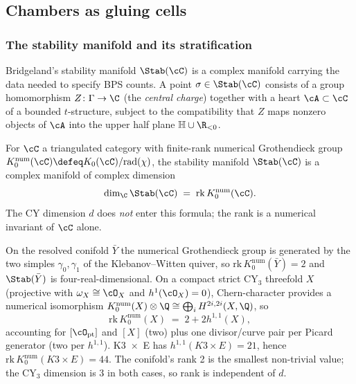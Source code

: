 \subsection{Chambers as gluing cells}
\label{sec:chambers-gluing-cells}

\subsubsection{The stability manifold and its stratification}

Bridgeland's stability manifold $\Stab(\cC)$ is a complex manifold carrying
the data needed to specify BPS counts. A point $\sigma \in \Stab(\cC)$
consists of a group homomorphism $Z \colon \Gamma \to \C$ (the
\emph{central charge}) together with a heart $\cA \subset \cC$ of a bounded
$t$-structure, subject to the compatibility that $Z$ maps nonzero objects of
$\cA$ into the upper half plane $\mathbb H \cup \R_{<0}$.

\begin{proposition}[Stab dimension = numerical Grothendieck rank, Bridgeland (2007, arXiv:math/0212237) Thm 7.1]
 \label{prop:stab-dim-equals-K0num-rank}
 For $\cC$ a triangulated category with finite-rank numerical Grothendieck
 group $K_0^{\mathrm{num}}(\cC) \defeq K_0(\cC) / \mathrm{rad}(\chi)$, the
 stability manifold $\Stab(\cC)$ is a complex manifold of complex dimension
 \[
 \dim_\C \Stab(\cC) \;=\; \mathrm{rk}\, K_0^{\mathrm{num}}(\cC).
 \]
 The CY dimension $d$ does \emph{not} enter this formula; the rank is a
 numerical invariant of $\cC$ alone.
\end{proposition}

\begin{example}
 \label{ex:conifold-strict-cy3-ranks}
 On the resolved conifold $\bar Y$ the numerical Grothendieck group is
 generated by the two simples $\gamma_0, \gamma_1$ of the Klebanov--Witten
 quiver, so $\mathrm{rk}\, K_0^{\mathrm{num}}(\bar Y) = 2$ and $\Stab(\bar
 Y)$ is four-real-dimensional. On a compact strict CY$_3$ threefold $X$
 (projective with $\omega_X \cong \cO_X$ and $h^1(\cO_X) = 0$),
 Chern-character provides a numerical isomorphism
 $K_0^{\mathrm{num}}(X) \otimes \Q \cong \bigoplus_i H^{2i, 2i}(X, \Q)$, so
 \[
 \mathrm{rk}\, K_0^{\mathrm{num}}(X) \;=\; 2 + 2 h^{1,1}(X),
 \]
 accounting for $[\cO_{\mathrm{pt}}]$ and $[X]$ (two) plus one
 divisor/curve pair per Picard generator (two per $h^{1,1}$). K3~$\times$~E
 has $h^{1,1}(K3 \times E) = 21$, hence
 $\mathrm{rk}\, K_0^{\mathrm{num}}(K3 \times E) = 44$. The conifold's rank
 2 is the smallest non-trivial value; the CY$_3$ dimension is $3$ in both
 cases, so rank is independent of $d$.
\end{example}

